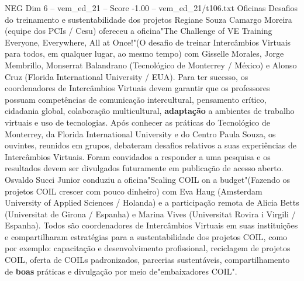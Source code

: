 \begin{textsample}{NEG Dim 6 – vem\_ed\_21 – Score -1.00 – vem\_ed\_21/t106.txt}  \label{ex:f6_neg_037}
Oficinas Desafios do treinamento e sustentabilidade dos projetos Regiane Souza Camargo Moreira (equipe dos PCIs / Cesu) ofereceu a oficina"The Challenge of VE Training Everyone, Everywhere, All at Once!"(O desafio de treinar Intercâmbios Virtuais para todos, em qualquer lugar, ao mesmo tempo) com Gisselle Morales, Jorge Membrillo, Monserrat Balandrano (Tecnológico de Monterrey / México) e Alonso Cruz (Florida International University / EUA).
Para ter sucesso, os coordenadores de Intercâmbios Virtuais devem garantir que os professores possuam competências de comunicação intercultural, pensamento crítico, cidadania global, colaboração multicultural, \textbf{adaptação} a ambientes de trabalho virtuais e uso de tecnologias.
Após conhecer as práticas do Tecnológico de Monterrey, da Florida International University e do Centro Paula Souza, os ouvintes, reunidos em grupos, debateram desafios relativos a suas experiências de Intercâmbios Virtuais.
Foram convidados a responder a uma pesquisa e os resultados devem ser divulgados futuramente em publicação de acesso aberto.
Osvaldo Succi Junior conduziu a oficina"Scaling COIL on a budget"(Fazendo os projetos COIL crescer com pouco dinheiro) com Eva Haug (Amsterdam University of Applied Sciences / Holanda) e a participação remota de Alicia Betts (Universitat de Girona / Espanha) e Marina Vives (Universitat Rovira i Virgili / Espanha).
Todos são coordenadores de Intercâmbios Virtuais em suas instituições e compartilharam estratégias para a sustentabilidade dos projetos COIL, como por exemplo: capacitação e desenvolvimento profissional, reciclagem de projetos COIL, oferta de COILs padronizados, parcerias sustentáveis, compartilhamento de \textbf{boas} práticas e divulgação por meio de"embaixadores COIL".

\end{textsample}
